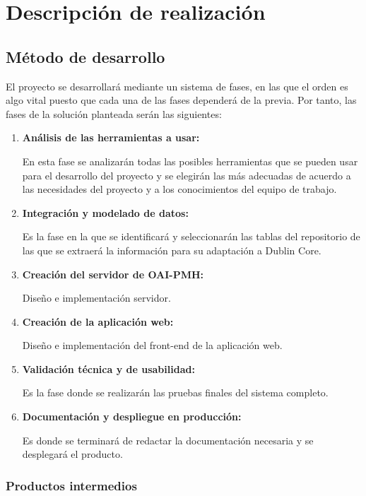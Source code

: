 \chapter{Descripción de realización}

\section{Método de desarrollo}

El proyecto se desarrollará mediante un sistema de fases, en las que el orden es algo vital puesto que cada una de las fases dependerá de la previa. Por tanto, las fases de la solución planteada serán las siguientes:

\begin{enumerate}
	\item \textbf{Análisis de las herramientas a usar:}

	En esta fase se analizarán todas las posibles herramientas que se pueden usar para el desarrollo del proyecto y se elegirán las más adecuadas de acuerdo a las necesidades del proyecto y a los conocimientos del equipo de trabajo.

	\item \textbf{Integración y modelado de datos:}

	Es la fase en la que se identificará y seleccionarán las tablas del repositorio de las que se extraerá la información para su adaptación a Dublin Core.

	\item \textbf{Creación del servidor de OAI-PMH:}

	Diseño e implementación servidor.

	\item \textbf{Creación de la aplicación web:}

	Diseño e implementación del front-end de la aplicación web. 

	\item \textbf{Validación técnica y de usabilidad:}

	Es la fase donde se realizarán las pruebas finales del sistema completo.

	\item \textbf{Documentación y despliegue en producción:}

	Es donde se terminará de redactar la documentación necesaria y se desplegará el producto.
\end{enumerate}

\subsection{Productos intermedios}

